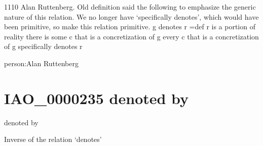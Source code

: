 \documentclass[letterpaper,10pt,english]{sphinxmanual}
\begin{document}
\begin{sphinxShadowBox}

\sphinxhyphen{}11\sphinxhyphen{}10 Alan Ruttenberg. Old definition said the following to emphasize the generic nature of this relation. We no longer have ‘specifically denotes’, which would have been primitive, so make this relation primitive.
g denotes r =def
r is a portion of reality
there is some c that is a concretization of g
every c that is a concretization of g specifically denotes r
\end{sphinxShadowBox}

\begin{sphinxShadowBox}

\sphinxAtStartPar
{}
\end{sphinxShadowBox}

\begin{sphinxShadowBox}

\sphinxAtStartPar
person:Alan Ruttenberg
\end{sphinxShadowBox}
\begin{quote}
\label{\detokenize{doc-IAO_0000235:iao-0000235}}\label{\detokenize{doc-IAO_0000235:denoted-by}}\label{\detokenize{doc-IAO_0000235:iao-0000235}}
\ignorespaces \end{quote}


\section{IAO\_0000235 \sphinxhyphen{} denoted by}
\label{\detokenize{doc-IAO_0000235:iao-0000235-denoted-by}}\label{\detokenize{doc-IAO_0000235:index-0}}\label{\detokenize{doc-IAO_0000235::doc}}
\begin{sphinxShadowBox}

\sphinxAtStartPar
denoted by
\end{sphinxShadowBox}

\begin{sphinxShadowBox}

\sphinxAtStartPar
Inverse of the relation ‘denotes’
\end{sphinxShadowBox}
\end{document}
